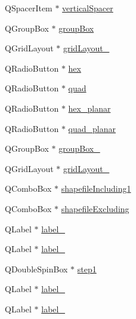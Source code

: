 \begin{DoxyCompactItemize}
Q\+Spacer\+Item $\ast$ \mbox{\hyperlink{class_ui___create_graph_dialog_a0fcc62e37a7f9ad8226273f517a1bcd5}{vertical\+Spacer}}
\item 
Q\+Group\+Box $\ast$ \mbox{\hyperlink{class_ui___create_graph_dialog_ac3c9819b433bf506aff7535dea28d50f}{group\+Box}}
\item 
Q\+Grid\+Layout $\ast$ \mbox{\hyperlink{class_ui___create_graph_dialog_ac12bfa3be5914f961e6b408ba68c6037}{grid\+Layout\+\_}}
\item 
Q\+Radio\+Button $\ast$ \mbox{\hyperlink{class_ui___create_graph_dialog_add173c958ea45b9af9a1e20cef231039}{hex}}
\item 
Q\+Radio\+Button $\ast$ \mbox{\hyperlink{class_ui___create_graph_dialog_a4653c15140c80f1af4ac9b378ccd085d}{quad}}
\item 
Q\+Radio\+Button $\ast$ \mbox{\hyperlink{class_ui___create_graph_dialog_ae0658a448629691d750b9719dab81eb0}{hex\+\_\+planar}}
\item 
Q\+Radio\+Button $\ast$ \mbox{\hyperlink{class_ui___create_graph_dialog_adaf633d54363cdabe0beb364d97a953e}{quad\+\_\+planar}}
\item 
Q\+Group\+Box $\ast$ \mbox{\hyperlink{class_ui___create_graph_dialog_a049f3cb10885278967db6906d516b5cf}{group\+Box\+\_}}
\item 
Q\+Grid\+Layout $\ast$ \mbox{\hyperlink{class_ui___create_graph_dialog_aaab3410f714d00998caf3658e1172853}{grid\+Layout\+\_}}
\item 
Q\+Combo\+Box $\ast$ \mbox{\hyperlink{class_ui___create_graph_dialog_abd688ab6928b2d91fcea5891d2ab359a}{shapefile\+Including1}}
\item 
Q\+Combo\+Box $\ast$ \mbox{\hyperlink{class_ui___create_graph_dialog_a5e51485b6979285468dbc28b7b30bb2c}{shapefile\+Excluding}}
\item 
Q\+Label $\ast$ \mbox{\hyperlink{class_ui___create_graph_dialog_ac191de06fe7af1904dd7100a572aae01}{label\+\_}}
\item 
Q\+Label $\ast$ \mbox{\hyperlink{class_ui___create_graph_dialog_afccba64a396a8e8f5d4bbc2ee6e920ef}{label\+\_}}
\item 
Q\+Double\+Spin\+Box $\ast$ \mbox{\hyperlink{class_ui___create_graph_dialog_a0623881ae79fde6d7d51edc8d644eccf}{step1}}
\item 
Q\+Label $\ast$ \mbox{\hyperlink{class_ui___create_graph_dialog_adc439633686b528c90919c0ce2114292}{label\+\_}}
\item 
Q\+Label $\ast$ \mbox{\hyperlink{class_ui___create_graph_dialog_a9aac0d8c5f408516284edc27b3d9bd9b}{label\+\_}}

\end{DoxyCompactItemize}
